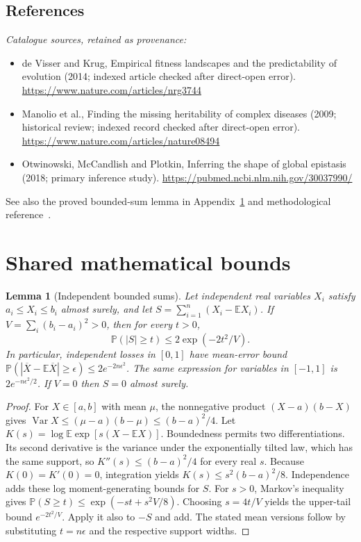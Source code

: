 \documentclass[11pt]{article}
\newcommand{\E}{\mathbb E}
\newcommand{\Prob}{\mathbb P}
\DeclareMathOperator{\Var}{Var}
\providecommand{\E}{\mathbb E}
\providecommand{\Prob}{\mathbb P}
\providecommand{\Var}{\operatorname{Var}}
\newtheorem{sharedlemma}{Lemma}[section]
\begin{document}
\subsection{References}
\noindent\emph{Catalogue sources, retained as provenance:}
\begin{itemize}
\item de Visser and Krug, Empirical fitness landscapes and the predictability of evolution (2014; indexed article checked after direct-open error). \url{https://www.nature.com/articles/nrg3744}
\item Manolio et al., Finding the missing heritability of complex diseases (2009; historical review; indexed record checked after direct-open error). \url{https://www.nature.com/articles/nature08494}
\item Otwinowski, McCandlish and Plotkin, Inferring the shape of global epistasis (2018; primary inference study). \url{https://pubmed.ncbi.nlm.nih.gov/30037990/}
\end{itemize}
\noindent See also the proved bounded-sum lemma in Appendix~\ref{app:bounds} and methodological reference~\cite{hoeffding}.
\clearpage


\appendix
\section{Shared mathematical bounds}\label{app:bounds}
\begin{sharedlemma}[Independent bounded sums]\label{lem:bounded}
Let independent real variables $X_i$ satisfy $a_i\leq X_i\leq b_i$ almost surely,
and let $S=\sum_{i=1}^n(X_i-\E X_i)$. If
$V=\sum_i(b_i-a_i)^2>0$, then for every $t>0$,
\[
 \Prob(|S|\geq t)\leq 2\exp(-2t^2/V).
\]
In particular, independent losses in $[0,1]$ have mean-error bound
$\Prob(|\overline X-\E\overline X|\geq\epsilon)
\leq2e^{-2n\epsilon^2}$. The same expression for variables in $[-1,1]$
is $2e^{-n\epsilon^2/2}$. If $V=0$ then $S=0$ almost surely.
\end{sharedlemma}
\begin{proof}
For $X\in[a,b]$ with mean $\mu$, the nonnegative product
$(X-a)(b-X)$ gives
$\Var X\leq(\mu-a)(b-\mu)\leq(b-a)^2/4$.
Let $K(s)=\log\E\exp[s(X-\E X)]$.
Boundedness permits two differentiations. Its second derivative is the variance
under the exponentially tilted law, which has the same support, so
$K''(s)\leq(b-a)^2/4$ for every real $s$.
Because $K(0)=K'(0)=0$, integration yields
$K(s)\leq s^2(b-a)^2/8$.
Independence adds these log moment-generating bounds for $S$.
For $s>0$, Markov's inequality gives
$\Prob(S\geq t)\leq\exp(-st+s^2V/8)$.
Choosing $s=4t/V$ yields the upper-tail bound $e^{-2t^2/V}$.
Apply it also to $-S$ and add. The stated mean versions follow by substituting
$t=n\epsilon$ and the respective support widths.
\end{proof}
\end{document}
